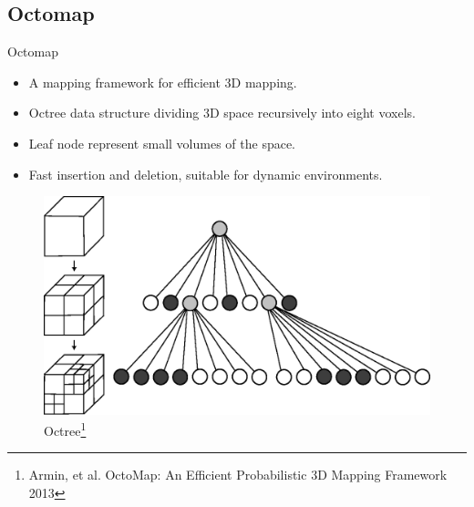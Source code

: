 \documentclass[10pt]{beamer}
\begin{document}
\subsection*{Octomap}
\begin{frame}{Octomap}


    \begin{itemize}
        \item A mapping framework for efficient 3D mapping.
        \item Octree data structure dividing 3D space recursively into eight voxels.
        \item Leaf node represent small volumes of the space.
        \item Fast insertion and deletion, suitable for dynamic environments.
    \end{itemize}

    \begin{figure}[!ht]
        \centering
        \includegraphics[scale=0.45]{octomap.eps}
        \caption{Octree\footnote{Armin, et al. OctoMap: An Efficient Probabilistic 3D Mapping Framework 2013}}
        \label{fig:octree}
    \end{figure}

\end{frame}
\end{document}
